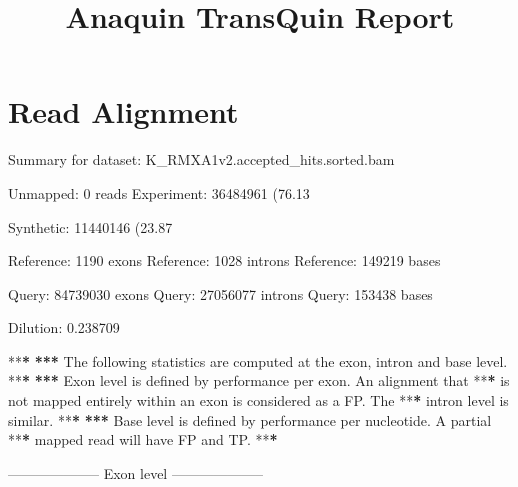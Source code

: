 \documentclass[]{article}
\title{Anaquin TransQuin Report}
\author{}
\date{}
\newenvironment{Shaded}{\begin{snugshade}}{\end{snugshade}}
\newcommand{\DecValTok}[1]{\textcolor[rgb]{0.00,0.00,0.81}{{#1}}}
\newcommand{\FloatTok}[1]{\textcolor[rgb]{0.00,0.00,0.81}{{#1}}}
\newcommand{\StringTok}[1]{\textcolor[rgb]{0.31,0.60,0.02}{{#1}}}
\newcommand{\ErrorTok}[1]{\textbf{{#1}}}
\newcommand{\NormalTok}[1]{{#1}}
\begin{document}
\maketitle


\section{Read Alignment}\label{read-alignment}

\begin{Shaded}
\begin{Highlighting}[]
\NormalTok{Summary for dataset:}\StringTok{ }\NormalTok{K_RMXA1v2.accepted_hits.sorted.bam}

   \NormalTok{Unmapped:}\StringTok{   }\DecValTok{0} \NormalTok{reads}
   \NormalTok{Experiment:}\StringTok{ }\DecValTok{36484961} \NormalTok{(}\FloatTok{76.13}\NormalTok{%
   \NormalTok{Synthetic:}\StringTok{  }\DecValTok{11440146} \NormalTok{(}\FloatTok{23.87}\NormalTok{%

   \NormalTok{Reference:}\StringTok{  }\DecValTok{1190} \NormalTok{exons}
   \NormalTok{Reference:}\StringTok{  }\DecValTok{1028} \NormalTok{introns}
   \NormalTok{Reference:}\StringTok{  }\DecValTok{149219} \NormalTok{bases}

   \NormalTok{Query:}\StringTok{      }\DecValTok{84739030} \NormalTok{exons}
   \NormalTok{Query:}\StringTok{      }\DecValTok{27056077} \NormalTok{introns}
   \NormalTok{Query:}\StringTok{      }\DecValTok{153438} \NormalTok{bases}

   \NormalTok{Dilution:}\StringTok{   }\FloatTok{0.238709}

   \NormalTok{**}\ErrorTok{*}
\StringTok{   }\ErrorTok{***}\StringTok{ }\NormalTok{The following statistics are computed at the exon, intron and base level.}
   \NormalTok{**}\ErrorTok{*}
\StringTok{   }\ErrorTok{***}\StringTok{ }\NormalTok{Exon level is defined by performance per exon. An alignment that}
   \NormalTok{**}\ErrorTok{*}\StringTok{ }\NormalTok{is not mapped entirely within an exon is considered as a FP. The}
   \NormalTok{**}\ErrorTok{*}\StringTok{ }\NormalTok{intron level is similar.}
   \NormalTok{**}\ErrorTok{*}
\StringTok{   }\ErrorTok{***}\StringTok{ }\NormalTok{Base level is defined by performance per nucleotide. A partial}
   \NormalTok{**}\ErrorTok{*}\StringTok{ }\NormalTok{mapped read will have FP and TP.}
   \NormalTok{**}\ErrorTok{*}

\StringTok{   }\NormalTok{--------------------}\StringTok{ }\NormalTok{Exon level --------------------}

}}
\end{Highlighting}
\end{Shaded}
\end{document}
